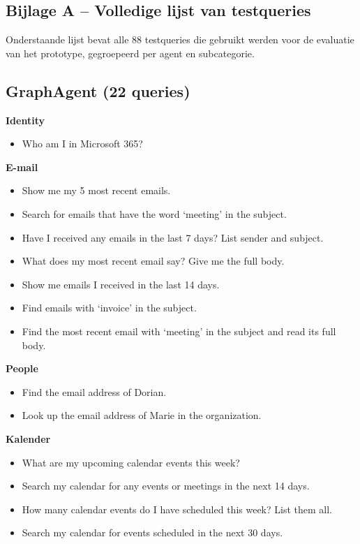 \begin{appendices}
\section*{Bijlage A -- Volledige lijst van testqueries}
\label{app:testqueries}

Onderstaande lijst bevat alle 88 testqueries die gebruikt werden voor de evaluatie van het prototype, gegroepeerd per agent en subcategorie.

\subsection*{GraphAgent (22 queries)}

\textbf{Identity}
\begin{itemize}[noitemsep]
  \item Who am I in Microsoft 365?
\end{itemize}

\textbf{E-mail}
\begin{itemize}[noitemsep]
  \item Show me my 5 most recent emails.
  \item Search for emails that have the word `meeting' in the subject.
  \item Have I received any emails in the last 7 days? List sender and subject.
  \item What does my most recent email say? Give me the full body.
  \item Show me emails I received in the last 14 days.
  \item Find emails with `invoice' in the subject.
  \item Find the most recent email with `meeting' in the subject and read its full body.
\end{itemize}

\textbf{People}
\begin{itemize}[noitemsep]
  \item Find the email address of Dorian.
  \item Look up the email address of Marie in the organization.
\end{itemize}

\textbf{Kalender}
\begin{itemize}[noitemsep]
  \item What are my upcoming calendar events this week?
  \item Search my calendar for any events or meetings in the next 14 days.
  \item How many calendar events do I have scheduled this week? List them all.
  \item Search my calendar for events scheduled in the next 30 days.
\end{itemize}


\end{appendices}
